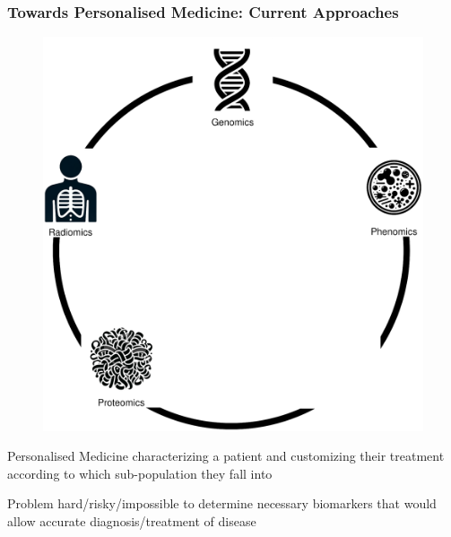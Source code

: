 \documentclass{beamer}
\begin{document}
\begin{frame}
	\frametitle{Towards Personalised Medicine: Current Approaches}
	\begin{minipage}{0.59\textwidth}
		\begin{figure}[H]
			\includegraphics[width=\textwidth]{images/approaches_current.eps}
		\end{figure}
	\end{minipage} 
	\begin{minipage}{0.39\textwidth}
		\begin{block}{Personalised Medicine}
			characterizing a patient and customizing their treatment according to which sub-population they fall into	
		\end{block}
		\begin{block}{Problem}
			hard/risky/impossible to determine necessary biomarkers that would allow accurate diagnosis/treatment of disease
		\end{block}

	\end{minipage}
\end{frame}
\end{document}
